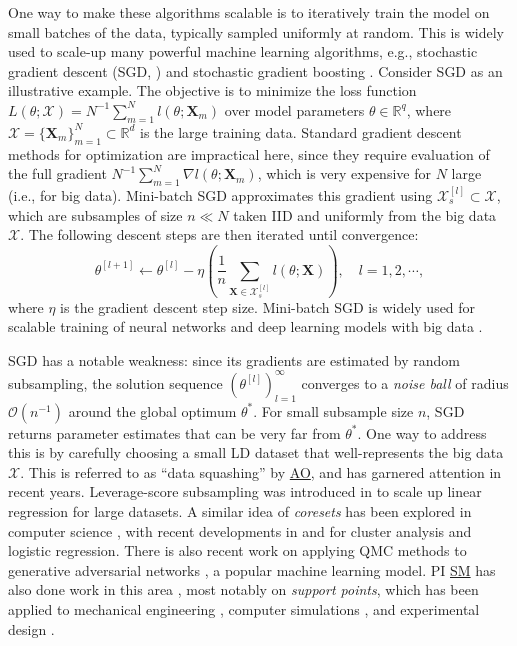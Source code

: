 \documentclass[11pt]{NSFamsart}
\newcommand{\SM}{\hyperlink{SMlink}{SM}\xspace}
\newcommand{\AO}{\hyperlink{AOlink}{AO}\xspace}
\newcommand{\bX}{{\boldsymbol{X}}}
\begin{document}
One way to make these algorithms scalable is to iteratively train the model on small batches of the data, typically sampled uniformly at random. This is widely used to scale-up many powerful machine learning algorithms, e.g., stochastic gradient descent (SGD, \cite{Bot2010}) and stochastic gradient boosting \cite{friedman2002stochastic}. Consider SGD as an illustrative example. The objective is to minimize the loss function $L(\theta;\mathcal{X}) = N^{-1} \sum_{m=1}^N l(\theta;\bX_m)$ over model parameters $\theta \in \mathbb{R}^q$, where $\mathcal{X} = \{\bX_m\}_{m=1}^N \subset \mathbb{R}^d$ is the large training data. Standard gradient descent methods for optimization \cite{nocedal2006numerical} are impractical here, since they require evaluation of the full gradient $N^{-1} \sum_{m=1}^N \nabla l(\theta;\bX_m)$, which is very expensive for $N$ large (i.e., for big data). Mini-batch SGD \cite{Bot2010} approximates this gradient using $\mathcal{X}_{s}^{[l]} \subset \mathcal{X}$, which are subsamples of size $n \ll N$ taken IID and uniformly from the big data $\mathcal{X}$. The following descent steps are then iterated until convergence:
\begin{equation}\label{eq:sgdopt}
\theta^{[l+1]} \leftarrow \theta^{[l]} - \eta \left( \frac{1}{n} \sum_{\bX \in \mathcal{X}_{s}^{[l]}} l(\theta;\bX)\right) , \quad l = 1, 2, \cdots,
\end{equation}
where $\eta$ is the gradient descent step size. Mini-batch SGD is widely used for scalable training of neural networks and deep learning models with big data \citep{srivastava2014dropout}.

SGD has a notable weakness: since its gradients are estimated by random subsampling, the solution sequence $(\theta^{[l]})_{l=1}^\infty$ converges to a \textit{noise ball} of radius $\mathcal{O}(n^{-1})$ around the global optimum $\theta^*$. For small subsample size $n$, SGD returns parameter estimates that can be very far from  $\theta^*$. One way to address this is by carefully choosing a small LD dataset that well-represents the big data $\mathcal{X}$. This is referred to as ``data squashing'' \cite{owen2003data} by \AO, and has garnered attention in recent years. Leverage-score subsampling was introduced in \cite{ma2015statistical} to scale up linear regression for large datasets. A similar idea of \textit{coresets} has been explored in computer science \cite{chan2006faster}, with recent developments in \cite{bachem2017practical} and \cite{huggins2016coresets} for cluster analysis and logistic regression. There is also recent work \cite{hofert2018quasi, chong2020effectively} on applying QMC methods to generative adversarial networks \cite{goodfellow2014generative}, a popular machine learning model. PI \SM has also done work in this area \cite{mak2018support,mak2018minimax,mak2017projected,krishna2019distributional}, most notably on \textit{support points}, which has been applied to mechanical engineering \cite{fernandez2018estimating}, computer simulations \citep{pronzato2020bayesian}, and experimental design \cite{krishna2020robust}.
\end{document}
